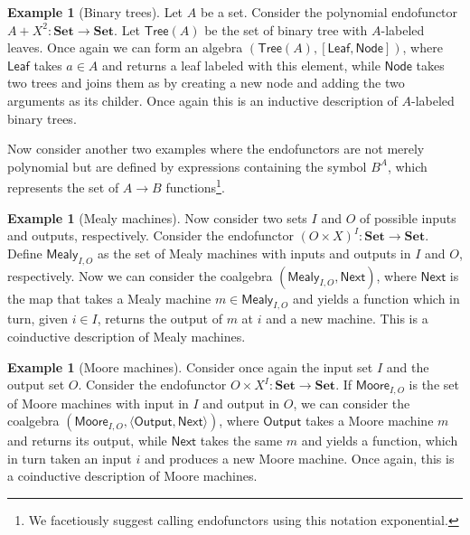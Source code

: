 \documentclass[12pt,a4paper,openright,twoside]{report}
\theoremstyle{plain}
\theoremstyle{definition}
\newtheorem{example}[proposition]{Example}
\begin{document}
\begin{example}[Binary trees]
  \label{ex: trees}
  Let $A$ be a set. Consider the polynomial endofunctor $A + X^2: \mathbf{Set} \to \mathbf{Set}$. Let $\mathsf{Tree}(A)$ be the set of binary tree with $A$-labeled leaves. Once again we can form an algebra $(\mathsf{Tree}(A), [\mathsf{Leaf},\mathsf{Node}])$, where $\mathsf{Leaf}$ takes $a \in A$ and returns a leaf labeled with this element, while $\mathsf{Node}$ takes two trees and joins them as by creating a new node and adding the two arguments as its childer. Once again this is an inductive description of $A$-labeled binary trees.
\end{example}

Now consider another two examples where the endofunctors are not merely polynomial but are defined by expressions containing the symbol $B^A$, which represents the set of $A \to B$ functions\footnote{We facetiously suggest calling endofunctors using this notation exponential.}.

\begin{example}[Mealy machines]
  \label{ex: mealy}
  Now consider two sets $I$ and $O$ of possible inputs and outputs, respectively. Consider the endofunctor $(O \times X)^I: \mathbf{Set} \to \mathbf{Set}$.  Define $\mathsf{Mealy}_{I,O}$ as the set of Mealy machines with inputs and outputs in $I$ and $O$, respectively. Now we can consider the coalgebra $(\mathsf{Mealy}_{I,O}, \mathsf{Next})$, where $\mathsf{Next}$ is the map that takes a Mealy machine $m \in \mathsf{Mealy}_{I,O}$ and yields a function which in turn, given $i \in I$, returns the output of $m$ at $i$ and a new machine. This is a coinductive description of Mealy machines.
\end{example}

\begin{example}[Moore machines]
  \label{ex: moore}
  Consider once again the input set $I$ and the output set $O$. Consider the endofunctor $O \times X^I: \mathbf{Set} \to \mathbf{Set}$. If $\mathsf{Moore}_{I,O}$ is the set of Moore machines with input in $I$ and output in $O$, we can consider the coalgebra $(\mathsf{Moore}_{I,O}, \langle \mathsf{Output}, \mathsf{Next} \rangle)$, where $\mathsf{Output}$ takes a Moore machine $m$ and returns its output, while $\mathsf{Next}$ takes the same $m$ and yields a function, which in turn taken an input $i$ and produces a new Moore machine. Once again, this is a coinductive description of Moore machines.
\end{example}
\end{document}
